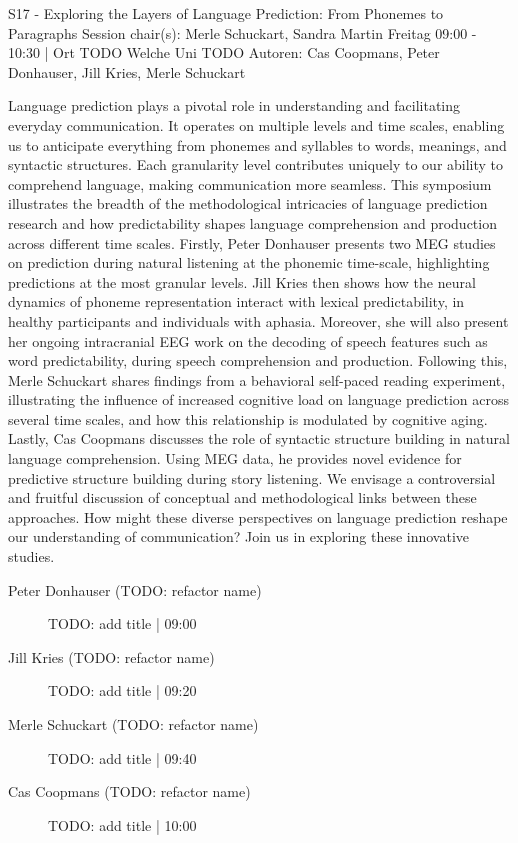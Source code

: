 
            \begin{symposium}
            {S17 - Exploring the Layers of Language Prediction: From Phonemes to Paragraphs}
            {Session chair(s): Merle Schuckart, Sandra Martin}
            {Freitag 09:00 - 10:30 | Ort TODO}
            {Welche Uni TODO}
            Autoren: Cas Coopmans, Peter Donhauser, Jill Kries, Merle Schuckart

Language prediction plays a pivotal role in understanding and facilitating everyday communication. It operates on multiple levels and time scales, enabling us to anticipate everything from phonemes and syllables to words, meanings, and syntactic structures. Each granularity level contributes uniquely to our ability to comprehend language, making communication more seamless. This symposium illustrates the breadth of the methodological intricacies of language prediction research and how predictability shapes language comprehension and production across different time scales.
Firstly, Peter Donhauser presents two MEG studies on prediction during natural listening at the phonemic time-scale, highlighting predictions at the most granular levels. Jill Kries then shows how the neural dynamics of phoneme representation interact with lexical predictability, in healthy participants and individuals with aphasia. Moreover, she will also present her ongoing intracranial EEG work on the decoding of speech features such as word predictability, during speech comprehension and production. Following this, Merle Schuckart shares findings from a behavioral self-paced reading experiment, illustrating the influence of increased cognitive load on language prediction across several time scales, and how this relationship is modulated by cognitive aging. Lastly, Cas Coopmans discusses the role of syntactic structure building in natural language comprehension. Using MEG data, he provides novel evidence for predictive structure building during story listening.
We envisage a controversial and fruitful discussion of conceptual and methodological links between these approaches. How might these diverse perspectives on language prediction reshape our understanding of communication? Join us in exploring these innovative studies.
            \begin{description}    
            
                \item [Peter Donhauser (TODO: refactor name)] TODO: add title \textcolor{mygray}{ | 09:00}    
                
                \item [Jill Kries (TODO: refactor name)] TODO: add title \textcolor{mygray}{ | 09:20}    
                
                \item [Merle Schuckart  (TODO: refactor name)] TODO: add title \textcolor{mygray}{ | 09:40}    
                
                \item [Cas Coopmans (TODO: refactor name)] TODO: add title \textcolor{mygray}{ | 10:00}    
                
            \end{description} 
            \end{symposium}
            